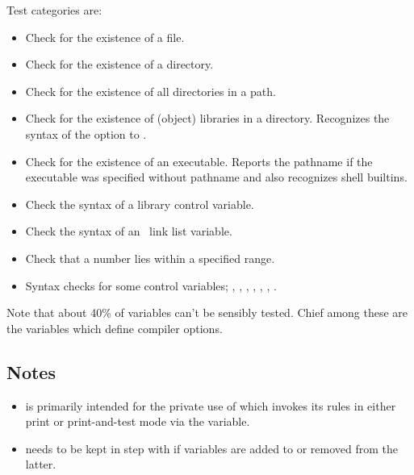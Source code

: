Test categories are:

\begin{itemize}
\item
   Check for the existence of a file.

\item
   Check for the existence of a directory.

\item
   Check for the existence of all directories in a path.

\item
   Check for the existence of (object) libraries in a directory.  Recognizes
   the syntax of the  option to .

\item
   Check for the existence of an executable.  Reports the pathname if the
   executable was specified without pathname and also recognizes shell
   builtins.

\item
   Check the syntax of a library control variable.

\item
   Check the syntax of an \aipspp\ link list variable.

\item
   Check that a number lies within a specified range.

\item
   Syntax checks for some control variables; , ,
   , , , ,
   .
\end{itemize}

\noindent
Note that about 40\% of  variables can't be sensibly
tested.  Chief among these are the variables which define compiler options.

\subsection*{Notes}
 
\begin{itemize}
\item
    is primarily intended for the private use of
    which invokes its rules in either print or
   print-and-test mode via the  variable.

\item
    needs to be kept in step with  if
   variables are added to or removed from the latter.
\end{itemize}

